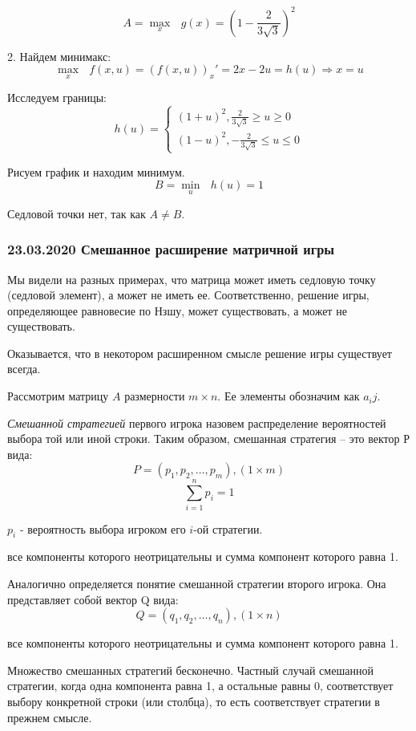 \documentclass[aps,%
12pt,%
final,%
oneside,
onecolumn,%
musixtex, %
superscriptaddress,%
centertags]{article} %
\begin{document}
$$ A = \underset{x}{\max} \text{ } g(x) = \left (1 - \frac{2}{3\sqrt {3}}\right)^2$$

2. Найдем минимакс:
$$ \underset{x}{\max} \text{ } f(x,u) = (f(x,u))_x'  = 2x -  2u = h(u) \Rightarrow x = u$$

Исследуем границы:
$$h(u) = \left\{
\begin{matrix}
(1+u)^2,\frac{2}{3\sqrt{3}}\geq u \geq 0 \\ 
(1-u)^2, -\frac{2}{3\sqrt{3}}\leq u \leq 0
\end{matrix}\right.$$

Рисуем график и находим минимум.
$$ B = \underset{u}{\min} \text{ } h(u) = 1 $$

Седловой точки нет, так как $A \neq B$.


\subsubsection{23.03.2020 Смешанное расширение матричной игры}

Мы видели на разных примерах, что матрица может иметь седловую точку (седловой элемент), а может не иметь ее. Соответственно, решение игры, определяющее равновесие по Нзшу, может существовать, а может не существовать. 

Оказывается, что в некотором расширенном смысле решение игры существует всегда.

Рассмотрим матрицу $A$ размерности $m \times n$. Ее элементы обозначим как $a_ij$.

\textit{Смешанной стратегией} первого игрока назовем распределение вероятностей выбора той или иной строки. Таким образом, смешанная стратегия – это вектор $Р$ вида:
$$ P = (p_1,p_2,\ldots,p_m), (1 \times m)$$
$$ \sum_{i=1}^n p_i = 1$$

$p_i$ - вероятность выбора игроком его $i$-ой стратегии.

все компоненты которого неотрицательны и сумма компонент которого равна 1. 

Аналогично определяется понятие смешанной стратегии второго игрока. Она представляет собой вектор Q вида:
$$Q = (q_1,q_2,\ldots, q_n), (1 \times n)$$

все компоненты которого неотрицательны и сумма компонент которого равна 1.

Множество смешанных стратегий бесконечно. Частный случай смешанной стратегии, когда одна компонента равна 1, а остальные равны 0, соответствует выбору конкретной строки (или столбца), то есть соответствует стратегии в прежнем смысле.  
\end{document}
